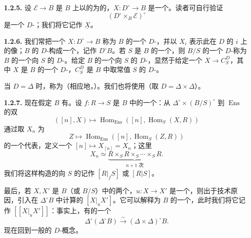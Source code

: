 \textbf{1.2.5.} 设 $\mathscr E\to B$ 是 $B$ 上以的为的，$X:D^\circ\to B$ 是一个。读者可自行验证
\[
(D^\circ\mathbin{\times}_B\mathscr E)^\circ
\]
是一个 $D$-；我们将它记作 $\underline X$。

\textbf{1.2.6.} 我们常把一个 $X:D^\circ\to B$ 称为 $B$ 的一个 $D$-，并以 $X_i$ 表示此在 $D$ 的 $i$ 上的像；$B$ 的 $D$-构成一个，记作 $D^\circ B$。若 $S$ 是 $B$ 的一个，则 $B/S$ 的一个 $D$-称为 $B$ 的一个向 $S$ 的 $D$-。给定 $B$ 的一个向 $S$ 的 $D$-，显然于给定一个 $X\to C_S^D$，其中 $X$ 是 $B$ 的一个 $D$-，$C_S^D$ 是 $B$ 中取常值 $S$ 的 $D$-。

当 $D=\Delta$ 时，称为（相应地，）。我们也将使用（取 $D=\Delta\times\Delta$）。

\textbf{1.2.7.} 现在假定 $B$ 有。设 $f:R\to S$ 是 $B$ 中的一个：从 $\Delta^\circ\times(B/S)^\circ$ 到 $\operatorname{Ens}$ 的双
\[
([n],X)\longmapsto\operatorname{Hom}_{\operatorname{Ens}}([n],\operatorname{Hom}_S(X,R))
\]
通过取 $X_n$ 为
\[
Z\longmapsto\operatorname{Hom}_{\operatorname{Ens}}([n],\operatorname{Hom}_S(Z,R))
\]
的一个代表，定义一个 $[n]\mapsto X_{[n]}=X_n$；这里
\[
X_n\simeq\underbrace{R\times_S R\times_S\cdots\times_S R}_{n+1\text{ 次}}.
\]
我们将这样构造的向 $S$ 的记作 $[R|_fS]$ 或 $[R|S]$。

最后，若 $X,X'$ 是 $B$（或 $B/S$）中的两个，$u:X\to X'$ 是一个，则出于技术原因，引入在 $\Delta^\circ B$ 中计算的 $[X|_uX']$。它可以解释为 $B$ 的一个，此时我们将它记作 $[[X|_uX']]$：事实上，有的一个
\[
\Delta^\circ(\Delta^\circ B)\xrightarrow{\sim}(\Delta\times\Delta)^\circ B.
\]
现在回到一般的 $D$-概念。

